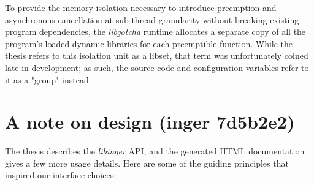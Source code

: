 \documentclass[12pt,letterpaper]{book}
\begin{document}
To provide the memory isolation necessary to introduce preemption and asynchronous cancellation at
sub-thread granularity without breaking existing program dependencies, the \textit{libgotcha} runtime
allocates a separate copy of all the program's loaded dynamic libraries for each preemptible
function.  While the thesis refers to this isolation unit as a libset, that term was unfortunately
coined late in development; as such, the source code and configuration variables refer to it as a
"group" instead.


\section{A note on design (inger 7d5b2e2)}

The thesis describes the \textit{libinger} API, and the generated HTML documentation gives a few more usage
details.  Here are some of the guiding principles that inspired our interface choices:
\end{document}
